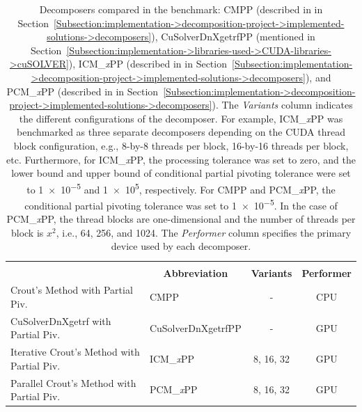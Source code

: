 \begin{table}[ht!]
	\centering
	\begin{tabular}{|ll|c|c|}
		\hline
		\rowcolor[HTML]{C0C0C0} 
		\multicolumn{2}{|c|}{\cellcolor[HTML]{C0C0C0}\textbf{Decomposer}} & \cellcolor[HTML]{C0C0C0} & \multicolumn{1}{c|}{\cellcolor[HTML]{C0C0C0}} \\
		\rowcolor[HTML]{EFEFEF} 
		\multicolumn{1}{|c|}{\cellcolor[HTML]{EFEFEF}\textbf{Name}} & \multicolumn{1}{c|}{\cellcolor[HTML]{EFEFEF}\textbf{Abbreviation}} & \multirow{-2}{*}{\cellcolor[HTML]{C0C0C0}\textbf{Variants}} & \multicolumn{1}{c|}{\multirow{-2}{*}{\cellcolor[HTML]{C0C0C0}\textbf{Performer}}} \\ \hline
		\multicolumn{1}{|l|}{Crout's Method with Partial Piv.}           & CMPP               &     -     & CPU \\
		\multicolumn{1}{|l|}{CuSolverDnXgetrf with Partial Piv.}         & CuSolverDnXgetrfPP &     -     & GPU \\
		\multicolumn{1}{|l|}{Iterative Crout's Method with Partial Piv.} & ICM\_\textit{x}PP  & 8, 16, 32 & GPU \\
		\multicolumn{1}{|l|}{Parallel Crout's Method with Partial Piv.}  & PCM\_\textit{x}PP  & 8, 16, 32 & GPU \\ \hline
	\end{tabular}
	\caption{Decomposers compared in the benchmark: CMPP (described in  in Section~\ref{Subsection:implementation->decomposition-project->implemented-solutions->decomposers}), CuSolverDnXgetrfPP (mentioned in Section~\ref{Subsection:implementation->libraries-used->CUDA-libraries->cuSOLVER}), ICM\_\textit{x}PP (described in  in Section~\ref{Subsection:implementation->decomposition-project->implemented-solutions->decomposers}), and PCM\_\textit{x}PP (described in  in Section~\ref{Subsection:implementation->decomposition-project->implemented-solutions->decomposers}).
		The \textit{Variants} column indicates the different configurations of the decomposer.
		For example, ICM\_\textit{x}PP was benchmarked as three separate decomposers depending on the CUDA thread block configuration, e.g., 8-by-8 threads per block, 16-by-16 threads per block, etc.
		Furthermore, for ICM\_\textit{x}PP, the processing tolerance was set to zero, and the lower bound and upper bound of conditional partial pivoting tolerance were set to \num{1e-5} and \num{1e+5}, respectively.
		For CMPP and PCM\_\textit{x}PP, the conditional partial pivoting tolerance was set to \num{1e-5}.
		In the case of PCM\_\textit{x}PP, the thread blocks are one-dimensional and the number of threads per block is $x^2$, i.e., 64, 256, and 1024.
		The \textit{Performer} column specifies the primary device used by each decomposer.
	}
	\label{Table:comparing-decomposers-and-solvers->decomposition-project-benchmarks->decomposers-benchmark->table-of-decomposers}
\end{table}

